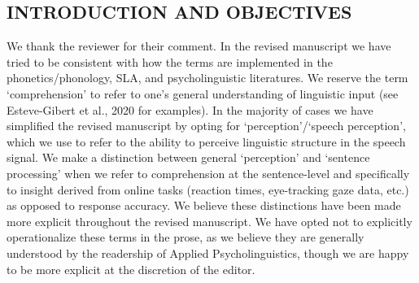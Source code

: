 \documentclass[]{article}
\newcommand{\TaskEstimationBox}[2]{%
\ifoptiondraft{\parbox{1.0\linewidth}{\hfill \hfill {\colorbox{#2}{\color{White} \textbf{#1}}}}}%
{}%
}
\def\Done {\TaskEstimationBox{Done}{Blue}}
\def\Easy {\TaskEstimationBox{Feasible}{ForestGreen}}
\begin{document}
\hypertarget{introduction-and-objectives}{%
\subsection{INTRODUCTION AND OBJECTIVES}\label{introduction-and-objectives}}


We thank the reviewer for their comment.
In the revised manuscript we have tried to be consistent with how the terms are implemented in the phonetics/phonology, SLA, and psycholinguistic literatures.
We reserve the term `comprehension' to refer to one's general understanding of linguistic input (see Esteve-Gibert et al., 2020 for examples).
In the majority of cases we have simplified the revised manuscript by opting for `perception'/`speech perception', which we use to refer to the ability to perceive linguistic structure in the speech signal.
We make a distinction between general `perception' and `sentence processing' when we refer to comprehension at the sentence-level and specifically to insight derived from online tasks (reaction times, eye-tracking gaze data, etc.) as opposed to response accuracy.
We believe these distinctions have been made more explicit throughout the revised manuscript.
We have opted not to explicitly operationalize these terms in the prose, as we believe they are generally understood by the readership of Applied Psycholinguistics, though we are happy to be more explicit at the discretion of the editor.

\Done
\Easy

\end{document}
